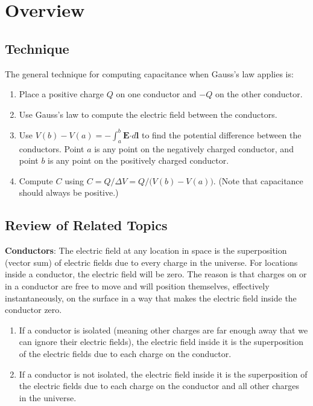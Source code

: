 \documentclass{article}
\newcommand{\ds}[0]{\displaystyle}
\newcommand{\bfcdot}[0]{\boldsymbol{\cdot}}
\begin{document}
\section{Overview}

\subsection{Technique}

The general technique for computing capacitance when Gauss's law applies is:

\begin{enumerate}

  \item Place a positive charge $Q$ on one conductor and $-Q$ on the other conductor.

  \item Use Gauss's law to compute the electric field between the conductors.

  \item Use $V(b)-V(a)=-\int^b_a \mathbf{E}\bfcdot d\mathbf{l}$ to find the potential difference between the conductors. Point $a$ is any point on the negatively charged conductor, and point $b$ is any point on the positively charged conductor.

  \item Compute $C$ using $\ds C = {Q}/{\Delta V} = Q/\big(V(b)-V(a)\big)$. (Note that capacitance should always be positive.)

\end{enumerate}

\subsection{Review of Related Topics}

\textbf{Conductors}: The electric field at any location in space is the superposition (vector sum) of electric fields due to every charge in the universe. For locations inside a conductor, the electric field will be zero. The reason is that charges on or in a conductor are free to move and will position themselves, effectively instantaneously, on the surface in a way that makes the electric field inside the conductor zero.

\begin{enumerate}

  \item If a conductor is isolated (meaning other charges are far enough away that we can ignore their electric fields), the electric field inside it is the superposition of the electric fields due to each charge on the conductor.

  \item If a conductor is not isolated, the electric field inside it is the superposition of the electric fields due to each charge on the conductor and all other charges in the universe.

\end{enumerate}
\end{document}
